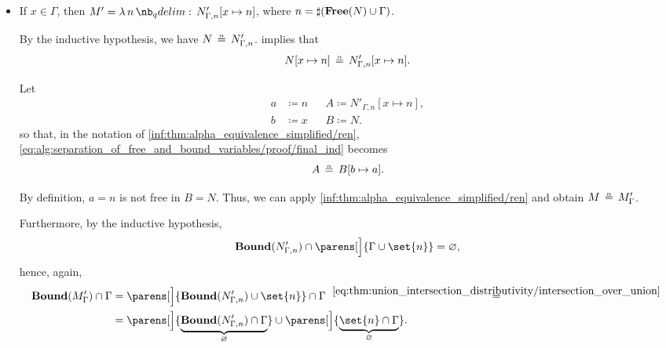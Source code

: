 \begin{defproof}
\begin{itemize}
\begin{itemize}
      \item If \( x \in \Gamma \), then \( M' = \qabs n N'_{\Gamma,n}[x \mapsto n] \), where \( n = \sharp(\op*{Free}(N) \cup \Gamma) \).

      By the inductive hypothesis, we have \( N \aequiv N'_{\Gamma,n} \).  implies that
      \begin{equation}\label{eq:alg:separation_of_free_and_bound_variables/proof/final_ind}
        N[x \mapsto n] \aequiv N'_{\Gamma,n}[x \mapsto n].
      \end{equation}

      Let
      \begin{align*}
        a &\coloneqq n && A \coloneqq N'_{\Gamma,n}[x \mapsto n], \\
        b &\coloneqq x && B \coloneqq N.
      \end{align*}
      so that, in the notation of \ref{inf:thm:alpha_equivalence_simplified/ren}, \eqref{eq:alg:separation_of_free_and_bound_variables/proof/final_ind} becomes
      \begin{equation*}
        A \aequiv B[b \mapsto a].
      \end{equation*}

      By definition, \( a = n \) is not free in \( B = N \). Thus, we can apply \ref{inf:thm:alpha_equivalence_simplified/ren} and obtain \( M \aequiv M'_\Gamma \).

      Furthermore, by the inductive hypothesis,
      \begin{equation*}
        \op*{Bound}(N'_{\Gamma,n}) \cap \parens[\Big]{ \Gamma \cup \set{ n } } = \varnothing,
      \end{equation*}
      hence, again,
      \begin{align*}
        \op*{Bound}(M'_\Gamma) \cap \Gamma
        &=
        \parens[\Big]{ \op*{Bound}(N'_{\Gamma,n}) \cup \set{ n } } \cap \Gamma
        \reloset {\eqref{eq:thm:union_intersection_distributivity/intersection_over_union}} = \\ &=
        \parens[\Big]{ \underbrace{\op*{Bound}(N'_{\Gamma,n}) \cap \Gamma }_\varnothing } \cup \parens[\Big]{ \underbrace{\set{ n } \cap \Gamma}_\varnothing }.
      \end{align*}
    \end{itemize}
  \end{itemize}
\end{defproof}
